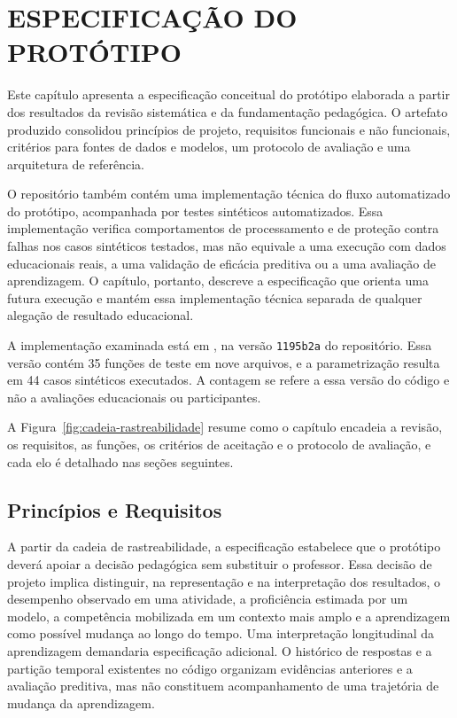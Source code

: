 \chapter{ESPECIFICAÇÃO DO PROTÓTIPO}
\label{cap:prototipo}

Este capítulo apresenta a especificação conceitual do protótipo elaborada a partir dos resultados da revisão sistemática e da fundamentação pedagógica. O artefato produzido consolidou princípios de projeto, requisitos funcionais e não funcionais, critérios para fontes de dados e modelos, um protocolo de avaliação e uma arquitetura de referência.

O repositório também contém uma implementação técnica do fluxo automatizado do protótipo, acompanhada por testes sintéticos automatizados. Essa implementação verifica comportamentos de processamento e de proteção contra falhas nos casos sintéticos testados, mas não equivale a uma execução com dados educacionais reais, a uma validação de eficácia preditiva ou a uma avaliação de aprendizagem. O capítulo, portanto, descreve a especificação que orienta uma futura execução e mantém essa implementação técnica separada de qualquer alegação de resultado educacional.

A implementação examinada está em \href{https://github.com/thalesfb/ccw/tree/1195b2a70619d123eb1888e3a8c9c34a813ab4e8/prototype}{}, na versão \texttt{1195b2a} do repositório. Essa versão contém 35 funções de teste em nove arquivos, e a parametrização resulta em 44 casos sintéticos executados. A contagem se refere a essa versão do código e não a avaliações educacionais ou participantes.

A Figura~\ref{fig:cadeia-rastreabilidade} resume como o capítulo encadeia a revisão, os requisitos, as funções, os critérios de aceitação e o protocolo de avaliação, e cada elo é detalhado nas seções seguintes.



\section{Princípios e Requisitos}
\label{sec:principios-requisitos}

A partir da cadeia de rastreabilidade, a especificação estabelece que o protótipo deverá apoiar a decisão pedagógica sem substituir o professor. Essa decisão de projeto implica distinguir, na representação e na interpretação dos resultados, o desempenho observado em uma atividade, a proficiência estimada por um modelo, a competência mobilizada em um contexto mais amplo e a aprendizagem como possível mudança ao longo do tempo. Uma interpretação longitudinal da aprendizagem demandaria especificação adicional. O histórico de respostas e a partição temporal existentes no código organizam evidências anteriores e a avaliação preditiva, mas não constituem acompanhamento de uma trajetória de mudança da aprendizagem.

